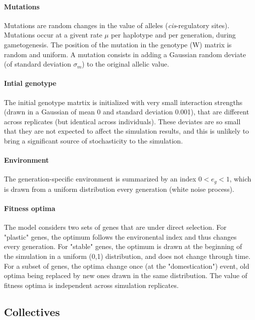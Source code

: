 \documentclass{article}
\begin{document}
\paragraph{Mutations} Mutations are random changes in the value of alleles (\emph{cis}-regulatory sites). Mutations occur at a givent rate $\mu$ per haplotype and per generation, during gametogenesis. The position of the mutation in the genotype ($\mathrm W$) matrix is random and uniform. A mutation consists in adding a Gaussian random deviate (of standard deviation $\sigma_m$) to the original allelic value. 

\paragraph{Intial genotype} The initial genotype matrtix is initialized with very small interaction strengths (drawn in a Gaussian of mean 0 and standard deviation 0.001), that are different across replicates (but identical across individuals). These deviates are so small that they are not expected to affect the simulation results, and this is unlikely to bring a significant source of stochasticity to the simulation.

\paragraph{Environment} The generation-specific environment is summarized by an index $0 < e_g < 1$, which is drawn from a uniform distribution every generation (white noise process).

\paragraph{Fitness optima} The model considers two sets of genes that are under direct selection. For "plastic" genes, the optimum follows the environental index and thus changes every generation. For "stable" genes, the optimum is drawn at the beginning of the simulation in a uniform (0,1) distribution, and does not change through time. For a subset of genes, the optima change once (at the "domestication") event, old optima being replaced by new ones drawn in the same distribution. The value of fitness optima is independent across simulation replicates. 

\subsection{Collectives}
\end{document}
